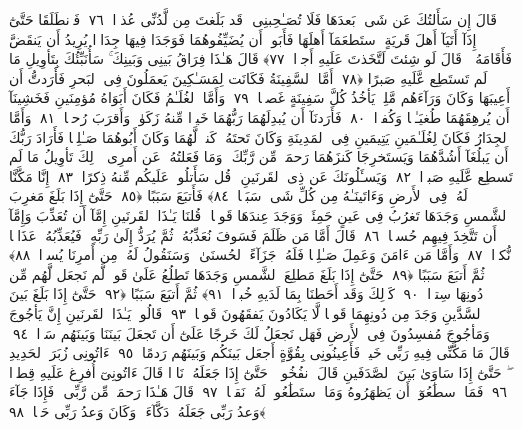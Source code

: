  قَالَ إِن سَأَلتُكَ عَن شَىءٍۭ بَعدَهَا فَلَا تُصَـٰحِبنِى ۖ قَد بَلَغتَ مِن لَّدُنِّى عُذرًۭا ﴿٧٦﴾
 فَٱنطَلَقَا حَتَّىٰٓ إِذَآ أَتَيَآ أَهلَ قَريَةٍ ٱستَطعَمَآ أَهلَهَا فَأَبَوا۟ أَن يُضَيِّفُوهُمَا فَوَجَدَا فِيهَا جِدَارًۭا يُرِيدُ أَن يَنقَضَّ فَأَقَامَهُۥ ۖ قَالَ لَو شِئتَ لَتَّخَذتَ عَلَيهِ أَجرًۭا ﴿٧٧﴾
 قَالَ هَـٰذَا فِرَاقُ بَينِى وَبَينِكَ ۚ سَأُنَبِّئُكَ بِتَأوِيلِ مَا لَم تَستَطِع عَّلَيهِ صَبرًا ﴿٧٨﴾
 أَمَّا ٱلسَّفِينَةُ فَكَانَت لِمَسَـٰكِينَ يَعمَلُونَ فِى ٱلبَحرِ فَأَرَدتُّ أَن أَعِيبَهَا وَكَانَ وَرَآءَهُم مَّلِكٌۭ يَأخُذُ كُلَّ سَفِينَةٍ غَصبًۭا ﴿٧٩﴾
 وَأَمَّا ٱلغُلَـٰمُ فَكَانَ أَبَوَاهُ مُؤمِنَينِ فَخَشِينَآ أَن يُرهِقَهُمَا طُغيَـٰنًۭا وَكُفرًۭا ﴿٨٠﴾
 فَأَرَدنَآ أَن يُبدِلَهُمَا رَبُّهُمَا خَيرًۭا مِّنهُ زَكَوٰةًۭ وَأَقرَبَ رُحمًۭا ﴿٨١﴾
 وَأَمَّا ٱلجِدَارُ فَكَانَ لِغُلَـٰمَينِ يَتِيمَينِ فِى ٱلمَدِينَةِ وَكَانَ تَحتَهُۥ كَنزٌۭ لَّهُمَا وَكَانَ أَبُوهُمَا صَـٰلِحًۭا فَأَرَادَ رَبُّكَ أَن يَبلُغَآ أَشُدَّهُمَا وَيَستَخرِجَا كَنزَهُمَا رَحمَةًۭ مِّن رَّبِّكَ ۚ وَمَا فَعَلتُهُۥ عَن أَمرِى ۚ ذَٟلِكَ تَأوِيلُ مَا لَم تَسطِع عَّلَيهِ صَبرًۭا ﴿٨٢﴾
 وَيَسـَٔلُونَكَ عَن ذِى ٱلقَرنَينِ ۖ قُل سَأَتلُوا۟ عَلَيكُم مِّنهُ ذِكرًا ﴿٨٣﴾
 إِنَّا مَكَّنَّا لَهُۥ فِى ٱلأَرضِ وَءَاتَينَـٰهُ مِن كُلِّ شَىءٍۢ سَبَبًۭا ﴿٨٤﴾
 فَأَتبَعَ سَبَبًا ﴿٨٥﴾
 حَتَّىٰٓ إِذَا بَلَغَ مَغرِبَ ٱلشَّمسِ وَجَدَهَا تَغرُبُ فِى عَينٍ حَمِئَةٍۢ وَوَجَدَ عِندَهَا قَومًۭا ۗ قُلنَا يَـٰذَا ٱلقَرنَينِ إِمَّآ أَن تُعَذِّبَ وَإِمَّآ أَن تَتَّخِذَ فِيهِم حُسنًۭا ﴿٨٦﴾
 قَالَ أَمَّا مَن ظَلَمَ فَسَوفَ نُعَذِّبُهُۥ ثُمَّ يُرَدُّ إِلَىٰ رَبِّهِۦ فَيُعَذِّبُهُۥ عَذَابًۭا نُّكرًۭا ﴿٨٧﴾
 وَأَمَّا مَن ءَامَنَ وَعَمِلَ صَـٰلِحًۭا فَلَهُۥ جَزَآءً ٱلحُسنَىٰ ۖ وَسَنَقُولُ لَهُۥ مِن أَمرِنَا يُسرًۭا ﴿٨٨﴾
 ثُمَّ أَتبَعَ سَبَبًا ﴿٨٩﴾
 حَتَّىٰٓ إِذَا بَلَغَ مَطلِعَ ٱلشَّمسِ وَجَدَهَا تَطلُعُ عَلَىٰ قَومٍۢ لَّم نَجعَل لَّهُم مِّن دُونِهَا سِترًۭا ﴿٩٠﴾
 كَذَٟلِكَ وَقَد أَحَطنَا بِمَا لَدَيهِ خُبرًۭا ﴿٩١﴾
 ثُمَّ أَتبَعَ سَبَبًا ﴿٩٢﴾
 حَتَّىٰٓ إِذَا بَلَغَ بَينَ ٱلسَّدَّينِ وَجَدَ مِن دُونِهِمَا قَومًۭا لَّا يَكَادُونَ يَفقَهُونَ قَولًۭا ﴿٩٣﴾
 قَالُوا۟ يَـٰذَا ٱلقَرنَينِ إِنَّ يَأجُوجَ وَمَأجُوجَ مُفسِدُونَ فِى ٱلأَرضِ فَهَل نَجعَلُ لَكَ خَرجًا عَلَىٰٓ أَن تَجعَلَ بَينَنَا وَبَينَهُم سَدًّۭا ﴿٩٤﴾
 قَالَ مَا مَكَّنِّى فِيهِ رَبِّى خَيرٌۭ فَأَعِينُونِى بِقُوَّةٍ أَجعَل بَينَكُم وَبَينَهُم رَدمًا ﴿٩٥﴾
 ءَاتُونِى زُبَرَ ٱلحَدِيدِ ۖ حَتَّىٰٓ إِذَا سَاوَىٰ بَينَ ٱلصَّدَفَينِ قَالَ ٱنفُخُوا۟ ۖ حَتَّىٰٓ إِذَا جَعَلَهُۥ نَارًۭا قَالَ ءَاتُونِىٓ أُفرِغ عَلَيهِ قِطرًۭا ﴿٩٦﴾
 فَمَا ٱسطَٰعُوٓا۟ أَن يَظهَرُوهُ وَمَا ٱستَطَٰعُوا۟ لَهُۥ نَقبًۭا ﴿٩٧﴾
 قَالَ هَـٰذَا رَحمَةٌۭ مِّن رَّبِّى ۖ فَإِذَا جَآءَ وَعدُ رَبِّى جَعَلَهُۥ دَكَّآءَ ۖ وَكَانَ وَعدُ رَبِّى حَقًّۭا ﴿٩٨﴾
